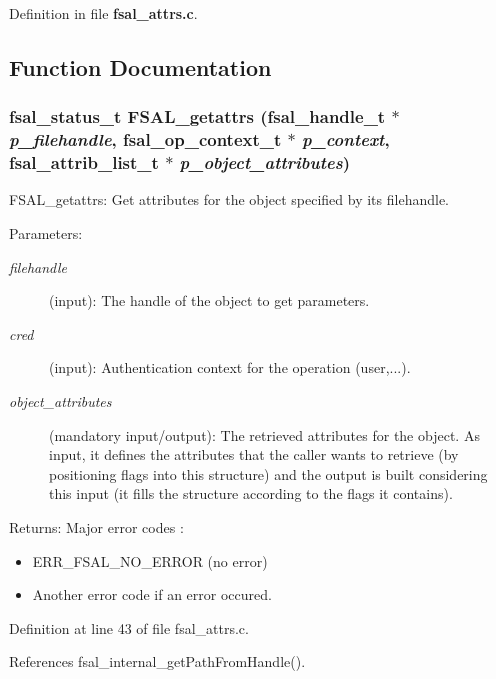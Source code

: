 Definition in file {\bf fsal\_\-attrs.c}.

\subsection{Function Documentation}
\subsubsection[{FSAL\_\-getattrs}]{\setlength{\rightskip}{0pt plus 5cm}fsal\_\-status\_\-t FSAL\_\-getattrs (fsal\_\-handle\_\-t $\ast$ {\em p\_\-filehandle}, \/  fsal\_\-op\_\-context\_\-t $\ast$ {\em p\_\-context}, \/  fsal\_\-attrib\_\-list\_\-t $\ast$ {\em p\_\-object\_\-attributes})}\label{fsal__attrs_8c_6442b3db127420aba2d823d6591ede1c}


FSAL\_\-getattrs: Get attributes for the object specified by its filehandle.

\begin{Desc}
\item[Parameters:]
\begin{description}
\item[{\em filehandle}](input): The handle of the object to get parameters. \item[{\em cred}](input): Authentication context for the operation (user,...). \item[{\em object\_\-attributes}](mandatory input/output): The retrieved attributes for the object. As input, it defines the attributes that the caller wants to retrieve (by positioning flags into this structure) and the output is built considering this input (it fills the structure according to the flags it contains).\end{description}
\end{Desc}
\begin{Desc}
\item[Returns:]Major error codes :\begin{itemize}
\item ERR\_\-FSAL\_\-NO\_\-ERROR (no error)\item Another error code if an error occured. \end{itemize}
\end{Desc}


Definition at line 43 of file fsal\_\-attrs.c.

References fsal\_\-internal\_\-getPathFromHandle().

